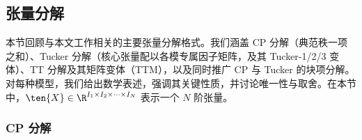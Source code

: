 \subsection{张量分解}
\label{subsec:tensor-decompositions}
本节回顾与本文工作相关的主要张量分解格式。我们涵盖 CP 分解（典范秩一项之和）、Tucker 分解（核心张量配以各模专属因子矩阵，及其 Tucker-1/2/3 变体）、TT 分解及其矩阵变体（TTM），以及同时推广 CP 与 Tucker 的块项分解。对每种模型，我们给出数学表述，强调其关键性质，并讨论唯一性与取舍。在本节中，$\ten{X} \in \R^{I_1 \times I_2 \times \cdots \times I_N}$ 表示一个 $N$ 阶张量。


\subsubsection{CP 分解}



